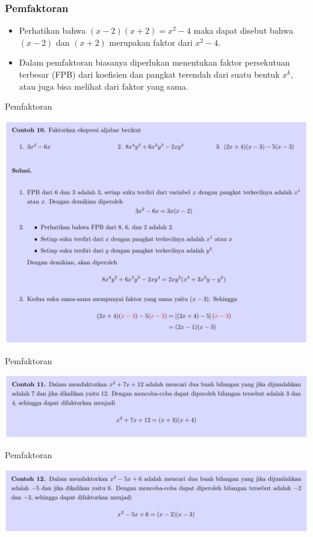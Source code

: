 \documentclass[pdflatex,compress,mathserif]{beamer}
\begin{document}
\begin{frame}
	\frametitle{Pemfaktoran}
	\begin{itemize}
		\item Perhatikan bahwa $(x - 2)(x + 2) = x^2 - 4$ maka dapat disebut bahwa $(x - 2)$ dan $(x + 2)$ merupakan faktor dari $x^2 - 4$.
		\item Dalam pemfaktoran biasanya diperlukan menentukan faktor persekutuan terbesar (FPB) dari koefisien dan pangkat terendah dari suatu bentuk $x^k$, atau juga bisa melihat dari faktor yang sama.
	\end{itemize}
\end{frame}

\begin{frame}{Pemfaktoran}
	\begin{center}
		\includegraphics[width=0.9\linewidth]{img/img25}
	\end{center}
\end{frame}

\begin{frame}{Pemfaktoran}
	\begin{center}
		\includegraphics[width=\linewidth]{img/img26}
	\end{center}
\end{frame}

\begin{frame}{Pemfaktoran}
	\begin{center}
		\includegraphics[width=\linewidth]{img/img27}
	\end{center}
\end{frame}
\end{document}
